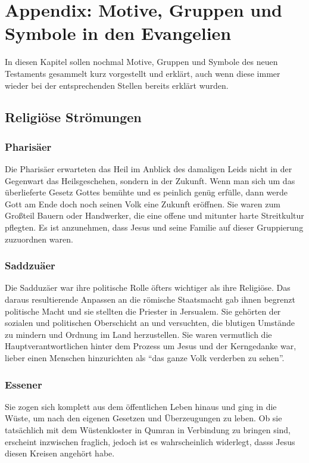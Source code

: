 \chapter{Appendix: Motive, Gruppen und Symbole in den Evangelien}
In diesen Kapitel sollen nochmal Motive, Gruppen und Symbole des neuen Testaments gesammelt kurz vorgestellt und erklärt, auch wenn diese immer wieder 
bei der entsprechenden Stellen bereits erklärt wurden.

\section{Religiöse Strömungen}
\subsection{Pharisäer}
Die Pharisäer erwarteten das Heil im Anblick des damaligen Leids nicht in der Gegenwart das Heilsgeschehen, sondern in der Zukunft. Wenn man sich 
um das überlieferte Gesetz Gottes bemühte und es peinlich genüg erfülle, dann werde Gott am Ende doch noch seinen Volk eine Zukunft eröffnen. 
Sie waren zum Großteil Bauern oder Handwerker, die eine offene und mitunter harte Streitkultur pflegten. Es ist anzunehmen, dass Jesus und seine 
Familie auf dieser Gruppierung zuzuordnen waren.

\subsection{Saddzuäer}
Die Sadduzäer war ihre politische Rolle öfters wichtiger als ihre Religiöse. Das daraus resultierende Anpassen an die römische Staatsmacht gab 
ihnen begrenzt politische Macht und sie stellten die Priester in Jersualem. Sie gehörten der sozialen und politischen Oberschicht an und versuchten, 
die blutigen Umstände zu mindern und Ordnung im Land herzustellen. Sie waren vermutlich die Hauptverantwortlichen hinter dem Prozess um Jesus 
und der Kerngedanke war, lieber einen Menschen hinzurichten als ``das ganze Volk verderben zu sehen''.

\subsection{Essener}
Sie zogen sich komplett aus dem öffentlichen Leben hinaus und ging in die Wüste, um nach den eigenen Gesetzen und Überzeugungen zu leben. 
Ob sie tatsächlich mit dem Wüstenkloster in Qumran in Verbindung zu bringen sind, erscheint inzwischen fraglich, jedoch ist es wahrscheinlich widerlegt, 
dasss Jesus diesen Kreisen angehört habe.

